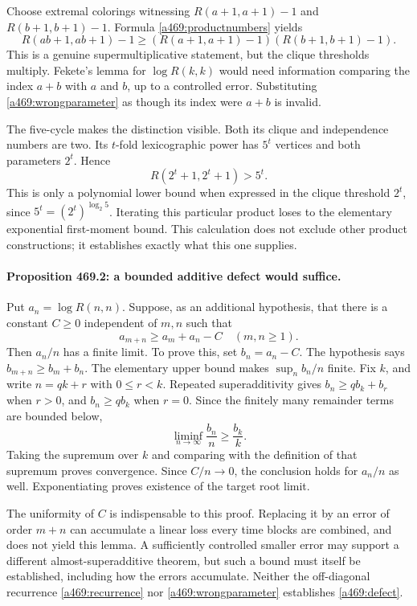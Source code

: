 \documentclass[11pt]{article}
\begin{document}
Choose extremal colorings witnessing $R(a+1,a+1)-1$ and $R(b+1,b+1)-1$. Formula \eqref{a469:productnumbers} yields
\begin{equation}\label{a469:wrongparameter}
 R(ab+1,ab+1)-1\geq
       (R(a+1,a+1)-1)(R(b+1,b+1)-1).
\end{equation}
This is a genuine supermultiplicative statement, but the clique thresholds multiply. Fekete's lemma for $\log R(k,k)$ would need information comparing the index $a+b$ with $a$ and $b$, up to a controlled error. Substituting \eqref{a469:wrongparameter} as though its index were $a+b$ is invalid.

The five-cycle makes the distinction visible. Both its clique and independence numbers are two. Its $t$-fold lexicographic power has $5^t$ vertices and both parameters $2^t$. Hence
\[
                         R(2^t+1,2^t+1)>5^t.
\]
This is only a polynomial lower bound when expressed in the clique threshold $2^t$, since $5^t=(2^t)^{\log_2 5}$. Iterating this particular product loses to the elementary exponential first-moment bound. This calculation does not exclude other product constructions; it establishes exactly what this one supplies.

\paragraph{Proposition 469.2: a bounded additive defect would suffice.}
Put $a_n=\log R(n,n)$. Suppose, as an additional hypothesis, that there is a constant $C\geq0$ independent of $m,n$ such that
\begin{equation}\label{a469:defect}
                    a_{m+n}\geq a_m+a_n-C
                    \quad(m,n\geq1).
\end{equation}
Then $a_n/n$ has a finite limit. To prove this, set $b_n=a_n-C$. The hypothesis says $b_{m+n}\geq b_m+b_n$. The elementary upper bound makes $\sup_n b_n/n$ finite. Fix $k$, and write $n=qk+r$ with $0\leq r<k$. Repeated superadditivity gives $b_n\geq q b_k+b_r$ when $r>0$, and $b_n\geq q b_k$ when $r=0$. Since the finitely many remainder terms are bounded below,
\[
                   \liminf_{n\to\infty}\frac{b_n}{n}
                      \geq\frac{b_k}{k}.
\]
Taking the supremum over $k$ and comparing with the definition of that supremum proves convergence. Since $C/n\to0$, the conclusion holds for $a_n/n$ as well. Exponentiating proves existence of the target root limit.

The uniformity of $C$ is indispensable to this proof. Replacing it by an error of order $m+n$ can accumulate a linear loss every time blocks are combined, and does not yield this lemma. A sufficiently controlled smaller error may support a different almost-superadditive theorem, but such a bound must itself be established, including how the errors accumulate. Neither the off-diagonal recurrence \eqref{a469:recurrence} nor \eqref{a469:wrongparameter} establishes \eqref{a469:defect}.
\end{document}
